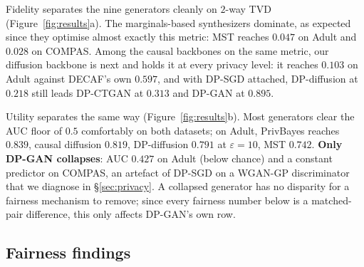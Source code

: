 \documentclass[manuscript,screen,review]{acmart}
\begin{document}
Fidelity separates the nine generators cleanly on $2$-way TVD
(Figure~\ref{fig:results}a). The marginals-based synthesizers dominate, as
expected since they optimise almost exactly this metric: MST reaches $0.047$
on Adult and $0.028$ on COMPAS. Among the causal backbones on the same
metric, our diffusion backbone is next and holds it at every privacy level:
it reaches $0.103$ on Adult against DECAF's own $0.597$, and with DP-SGD
attached, DP-diffusion at $0.218$ still leads DP-CTGAN at $0.313$ and DP-GAN
at $0.895$.

Utility separates the same way (Figure~\ref{fig:results}b). Most generators
clear the AUC floor of $0.5$ comfortably on both datasets; on Adult,
PrivBayes reaches $0.839$, causal diffusion $0.819$, DP-diffusion $0.791$
at $\varepsilon{=}10$, MST $0.742$. \textbf{Only DP-GAN collapses}: AUC
$0.427$ on Adult (below chance) and a constant predictor on COMPAS, an
artefact of DP-SGD on a WGAN-GP discriminator that we diagnose in
\S\ref{sec:privacy}. A collapsed generator has no disparity for a fairness
mechanism to remove; since every fairness number below is a matched-pair
difference, this only affects DP-GAN's own row.


\subsection{Fairness findings}
\label{sec:fairness}
\end{document}
